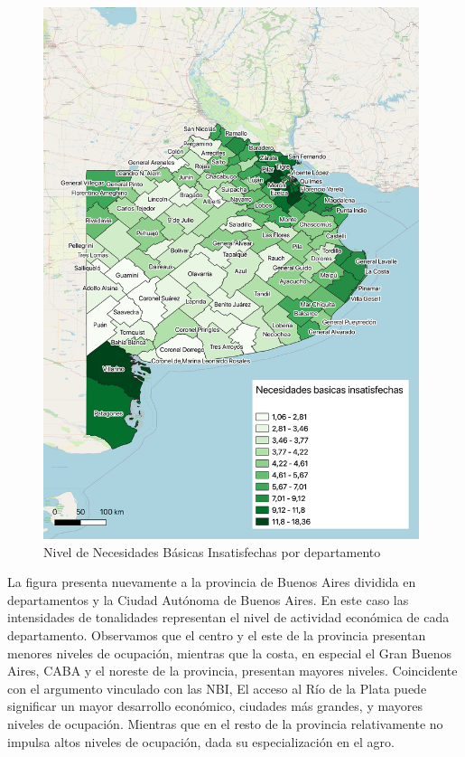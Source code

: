 \documentclass[11pt, spanish]{article}
\begin{document}
\begin{figure}[hbtp]
\caption{Nivel de Necesidades Básicas Insatisfechas por departamento }
\centering
\includegraphics[width=11cm]{NBI.jpg}
\end{figure}

\indent La figura presenta nuevamente a la provincia de Buenos Aires dividida en departamentos y la Ciudad Autónoma de Buenos Aires. En este caso las intensidades de tonalidades representan el nivel de actividad económica de cada departamento. Observamos que el centro y el este de la provincia presentan menores niveles de ocupación, mientras que la costa, en especial el Gran Buenos Aires, CABA y el noreste de la provincia, presentan mayores niveles. Coincidente con el argumento vinculado con las NBI, El acceso al Río de la Plata puede significar un mayor desarrollo económico, ciudades más grandes, y mayores niveles de ocupación. Mientras que en el resto de la provincia relativamente no impulsa altos niveles de ocupación, dada su especialización en el agro. 
\end{document}
